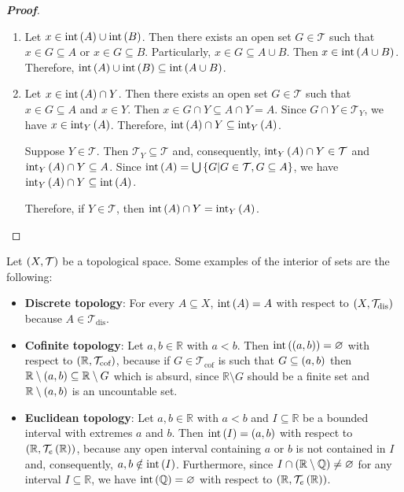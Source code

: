 \begin{proposition}
\begin{proof}[\rm\textbf{Proof}]
\begin{enumerate}
      Therefore, $\interior\pr{A}\cap\interior\pr{B}=\interior\pr{A\cap B}$.
      \item Let $x\in \operatorname{int}\left(A\right)\cup\operatorname{int}\left(B\right)$. Then there exists an open set $G\in\mathcal{T}$ such that $x\in G\subseteq A$ or $x\in G\subseteq B$. Particularly, $x\in G\subseteq A\cup B$. Then $x\in\operatorname{int}\left(A\cup B\right)$. Therefore, $\operatorname{int}\left(A\right)\cup\operatorname{int}\left(B\right)\subseteq\operatorname{int}\left(A\cup B\right)$.
      \item Let $x\in\operatorname{int}\left(A\right)\cap Y$. Then there exists an open set $G\in\mathcal{T}$ such that $x\in G\subseteq A$ and $x\in Y$. Then $x\in G\cap Y\subseteq A\cap Y=A$. Since $G\cap Y\in\mathcal{T}_Y$, we have $x\in\operatorname{int}_Y\left(A\right)$. Therefore, $\operatorname{int}\left(A\right)\cap Y\subseteq\operatorname{int}_Y\left(A\right)$.
      
      Suppose $Y\in\mathcal{T}$. Then $\mathcal{T}_Y\subseteq\mathcal{T}$ and, consequently, $\operatorname{int}_Y\left(A\right)\cap Y\in\mathcal{T}$ and $\operatorname{int}_Y\left(A\right)\cap Y\subseteq A$. Since $\operatorname{int}\left(A\right)=\bigcup\left\{G\middle|G\in\mathcal{T},G\subseteq A\right\}$, we have $\operatorname{int}_Y\left(A\right)\cap Y\subseteq\operatorname{int}\left(A\right)$. 
      
      Therefore, if $Y\in\mathcal{T}$, then $\operatorname{int}\left(A\right)\cap Y=\operatorname{int}_Y\left(A\right)$.
    \end{enumerate}
  \end{proof}
\end{proposition}

\begin{example}
  Let $\left(X,\mathcal{T}\right)$ be a topological space. Some examples of the interior of sets are the following:

  \begin{itemize}
    \item \textbf{Discrete topology}: For every $A\subseteq X$, $\operatorname{int}\left(A\right)=A$ with respect to $\left(X,\mathcal{T}_{\text{dis}}\right)$ because $A\in\mathcal{T}_{\text{dis}}$.
    \item \textbf{Cofinite topology}: Let $a,b\in\mathbb{R}$ with $a<b$. Then $\operatorname{int}\left(\left(a,b\right)\right)=\varnothing$ with respect to $\left(\mathbb{R},\mathcal{T}_{\text{cof}}\right)$, because if $G\in\mathcal{T}_{\text{cof}}$ is such that $G\subseteq\left(a,b\right)$ then $\mathbb{R}\setminus\left(a,b\right)\subseteq\mathbb{R}\setminus G$ which is absurd, since $\mathbb{R}\setminus G$ should be a finite set and $\mathbb{R}\setminus\left(a,b\right)$ is an uncountable set.
    \item \textbf{Euclidean topology}: Let $a,b\in\mathbb{R}$ with $a<b$ and $I\subseteq\mathbb{R}$ be a bounded interval with extremes $a$ and $b$. Then $\operatorname{int}\left(I\right)=\left(a,b\right)$ with respect to $\left(\mathbb{R},\mathcal{T}_e\left(\mathbb{R}\right)\right)$, because any open interval containing $a$ or $b$ is not contained in $I$ and, consequently, $a,b\notin\operatorname{int}\left(I\right)$. Furthermore, since $I\cap\left(\mathbb{R}\setminus\mathbb{Q}\right)\neq\varnothing$ for any interval $I\subseteq\mathbb{R}$, we have $\operatorname{int}\left(\mathbb{Q}\right)=\varnothing$ with respect to $\left(\mathbb{R},\mathcal{T}_e\left(\mathbb{R}\right)\right)$.
  \end{itemize}
\end{example}

